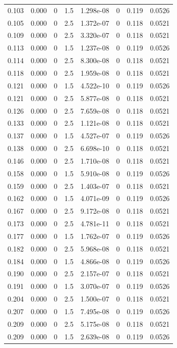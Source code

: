 \documentclass[preview]{standalone}
\begin{document}
{{\begin{tabular}{L{1.2cm}C{1.2cm} C{0.3cm}C{0.5cm} C{1.4cm}C{1.4cm} C{1.4cm}C{1.4cm}}
  0.103  &  0.000  & 0     & 1.5 &  1.298e-08  & 0  & 0.119 &  0.0526   \\ 
  0.105  &  0.000  & 0     & 2.5 &  1.372e-07  & 0  & 0.118 &  0.0521   \\ 
  0.109  &  0.000  & 0     & 2.5 &  3.320e-07  & 0  & 0.118 &  0.0521   \\ 
  0.113  &  0.000  & 0     & 1.5 &  1.237e-08  & 0  & 0.119 &  0.0526   \\ 
  0.114  &  0.000  & 0     & 2.5 &  8.300e-08  & 0  & 0.118 &  0.0521   \\ 
  0.118  &  0.000  & 0     & 2.5 &  1.959e-08  & 0  & 0.118 &  0.0521   \\ 
  0.121  &  0.000  & 0     & 1.5 &  4.522e-10  & 0  & 0.119 &  0.0526   \\ 
  0.121  &  0.000  & 0     & 2.5 &  5.877e-08  & 0  & 0.118 &  0.0521   \\ 
  0.126  &  0.000  & 0     & 2.5 &  7.659e-08  & 0  & 0.118 &  0.0521   \\ 
  0.133  &  0.000  & 0     & 2.5 &  1.121e-08  & 0  & 0.118 &  0.0521   \\ 
  0.137  &  0.000  & 0     & 1.5 &  4.527e-07  & 0  & 0.119 &  0.0526   \\ 
  0.138  &  0.000  & 0     & 2.5 &  6.698e-10  & 0  & 0.118 &  0.0521   \\ 
  0.146  &  0.000  & 0     & 2.5 &  1.710e-08  & 0  & 0.118 &  0.0521   \\ 
  0.158  &  0.000  & 0     & 1.5 &  5.910e-08  & 0  & 0.119 &  0.0526   \\ 
  0.159  &  0.000  & 0     & 2.5 &  1.403e-07  & 0  & 0.118 &  0.0521   \\ 
  0.162  &  0.000  & 0     & 1.5 &  4.071e-09  & 0  & 0.119 &  0.0526   \\ 
  0.167  &  0.000  & 0     & 2.5 &  9.172e-08  & 0  & 0.118 &  0.0521   \\ 
  0.173  &  0.000  & 0     & 2.5 &  4.781e-11  & 0  & 0.118 &  0.0521   \\ 
  0.177  &  0.000  & 0     & 1.5 &  1.762e-07  & 0  & 0.119 &  0.0526   \\ 
  0.182  &  0.000  & 0     & 2.5 &  5.968e-08  & 0  & 0.118 &  0.0521   \\ 
  0.184  &  0.000  & 0     & 1.5 &  4.866e-08  & 0  & 0.119 &  0.0526   \\ 
  0.190  &  0.000  & 0     & 2.5 &  2.157e-07  & 0  & 0.118 &  0.0521   \\ 
  0.191  &  0.000  & 0     & 1.5 &  3.070e-07  & 0  & 0.119 &  0.0526   \\ 
  0.204  &  0.000  & 0     & 2.5 &  1.500e-07  & 0  & 0.118 &  0.0521   \\ 
  0.207  &  0.000  & 0     & 1.5 &  7.495e-08  & 0  & 0.119 &  0.0526   \\ 
  0.209  &  0.000  & 0     & 2.5 &  5.175e-08  & 0  & 0.118 &  0.0521   \\ 
  0.209  &  0.000  & 0     & 1.5 &  2.639e-08  & 0  & 0.119 &  0.0526   \\ 
\hline 
\end{tabular} 

}}
\end{document}
